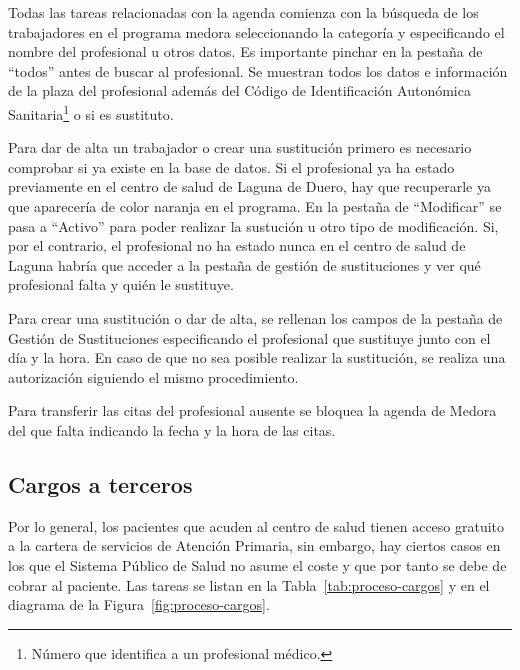Todas las tareas relacionadas con la agenda comienza con la búsqueda de los trabajadores en el programa \Gls{medora} seleccionando la categoría y especificando el nombre del profesional u otros datos.
Es importante pinchar en la pestaña de ``todos'' antes de buscar al profesional.
Se muestran todos los datos e información de la plaza del profesional además del Código de Identificación Autonómica Sanitaria\footnote{Número que identifica a un profesional médico.} o si es sustituto.

Para dar de alta un trabajador o crear una sustitución primero es necesario comprobar si ya existe en la base de datos.
Si el profesional ya ha estado previamente en el centro de salud de Laguna de Duero, hay que recuperarle ya que aparecería de color naranja en el programa.
En la pestaña de ``Modificar'' se pasa a ``Activo'' para poder realizar la sustución u otro tipo de modificación.
Si, por el contrario, el profesional no ha estado nunca en el centro de salud de Laguna habría que acceder a la pestaña de gestión de sustituciones y ver qué profesional falta y quién le sustituye.

Para crear una sustitución o dar de alta, se rellenan los campos de la pestaña de Gestión de Sustituciones especificando el profesional que sustituye junto con el día y la hora. En caso de que no sea posible realizar la sustitución, se realiza una autorización siguiendo el mismo procedimiento.

Para transferir las citas del profesional ausente se bloquea la agenda de Medora del que falta indicando la fecha y la hora de las citas.

\subsection{Cargos a terceros}

Por lo general, los pacientes que acuden al centro de salud tienen acceso gratuito a la cartera de servicios de Atención Primaria, sin embargo, hay ciertos casos en los que el Sistema Público de Salud no asume el coste y que por tanto se debe de cobrar al paciente. Las tareas se listan en la Tabla~\ref{tab:proceso-cargos} y en el diagrama de la Figura~\ref{fig:proceso-cargos}.

